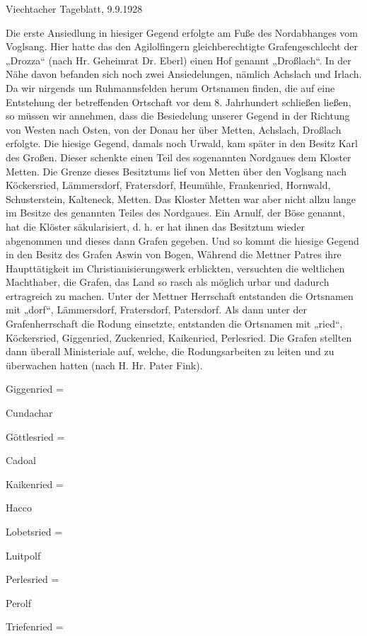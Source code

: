 \documentclass[12pt,a4paper]{book}
\begin{document}
Viechtacher Tageblatt, 9.9.1928

Die erste Ansiedlung in hiesiger Gegend erfolgte am Fuße des Nordabhanges vom
Voglsang. Hier hatte das den Agilolfingern gleichberechtigte Grafengeschlecht
der „Drozza“ (nach Hr. Geheimrat Dr. Eberl) einen Hof genannt „Droßlach“. In der
Nähe davon befanden sich noch zwei Ansiedelungen, nämlich Achslach und Irlach.
Da wir nirgends um Ruhmannsfelden herum Ortsnamen finden, die auf eine
Entstehung der betreffenden Ortschaft vor dem 8. Jahrhundert schließen ließen,
so müssen wir annehmen, dass die Besiedelung unserer Gegend in der Richtung von
Westen nach Osten, von der Donau her über Metten, Achslach, Droßlach erfolgte.
Die hiesige Gegend, damals noch Urwald, kam später in den Besitz Karl des
Großen. Dieser schenkte einen Teil des sogenannten Nordgaues dem Kloster Metten.
Die Grenze dieses Besitztums lief von Metten über den Voglsang nach Köckersried,
Lämmersdorf, Fratersdorf, Heumühle, Frankenried, Hornwald, Schusterstein,
Kalteneck, Metten. Das Kloster Metten war aber nicht allzu lange im Besitze des
genannten Teiles des Nordgaues. Ein Arnulf, der Böse genannt, hat die Klöster
säkularisiert, d. h. er hat ihnen das Besitztum wieder abgenommen und dieses
dann Grafen gegeben. Und so kommt die hiesige Gegend in den Besitz des Grafen
Aswin von Bogen, Während die Mettner Patres ihre Haupttätigkeit im
Christianisierungswerk erblickten, versuchten die weltlichen Machthaber, die
Grafen, das Land so rasch als möglich urbar und dadurch ertragreich zu machen.
Unter der Mettner Herrschaft entstanden die Ortsnamen mit „dorf“, Lämmersdorf,
Fratersdorf, Patersdorf. Als dann unter der Grafenherrschaft die Rodung
einsetzte, entstanden die Ortsnamen mit „ried“, Köckersried, Giggenried,
Zuckenried, Kaikenried, Perlesried. Die Grafen stellten dann überall
Ministeriale auf, welche, die Rodungsarbeiten zu leiten und zu überwachen hatten
(nach H. Hr. Pater Fink).



Giggenried    =

Cundachar

Göttlesried    =

Cadoal

Kaikenried    =

Hacco

Lobetsried    =

Luitpolf

Perlesried    =

Perolf

Triefenried    =
\end{document}

